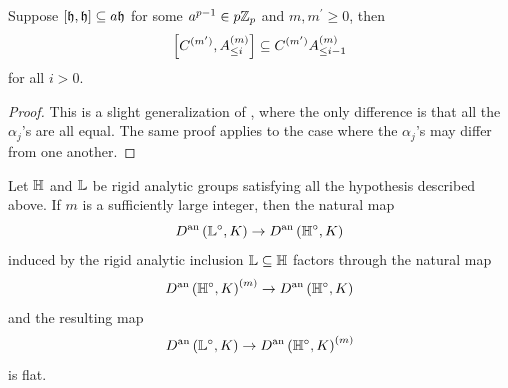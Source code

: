 \documentclass[10pt]{amsart}
\begin{document}
\begin{proposition}\label{prop:commutator}
Suppose $\left[\mathfrak{h},\mathfrak{h}\right]\subseteq a\mathfrak{h}$ for some $a^{p-1}\in p\mathbb{Z}_{p}$ and $m,m^{\prime}\geq 0$, then \[
    \left[C^{(m^{\prime})},A^{(m)}_{\leq i}\right] \subseteq C^{(m^{\prime})}A^{(m)}_{\leq i-1}
\] for all $i>0$. 
\end{proposition}
\begin{proof}
This is a slight generalization of \cite[Prop. 5.2.17]{analytic}, where the only difference is that all the $\alpha_{j}$'s are all equal. The same proof applies to the case where the $\alpha_{j}$'s may differ from one another.   
\end{proof}

\begin{theorem}\label{thm:flat}
Let $\mathbb{H}$ and $\mathbb{L}$ be rigid analytic groups satisfying all the hypothesis described above. If $m$ is a sufficiently large integer, then the natural map \[
    D^{\textnormal{an}}\left(\mathbb{L}^{\circ},K\right)\rightarrow D^{\textnormal{an}}\left(\mathbb{H}^{\circ},K\right)\]
induced by the rigid analytic inclusion $\mathbb{L}\subseteq \mathbb{H}$ factors through the natural map \[
    D^{\textnormal{an}}\left(\mathbb{H}^{\circ},K\right)^{(m)}\rightarrow D^{\textnormal{an}}\left(\mathbb{H}^{\circ},K\right)
\] and the resulting map \[
    D^{\textnormal{an}}\left(\mathbb{L}^{\circ},K\right)\rightarrow D^{\textnormal{an}}\left(\mathbb{H}^{\circ},K\right)^{(m)}
\] is flat.
\end{theorem}
\end{document}
